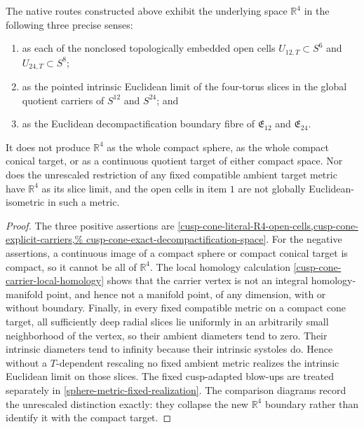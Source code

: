 \begin{corollary}
\label{cusp-cone-sharp-global-R4-scope}
The native routes constructed above exhibit the underlying space
\(\mathbb R^4\) in the following three precise senses:
\begin{enumerate}
\item as each of the nonclosed topologically embedded open cells
\(U_{12,T}\subset S^6\) and \(U_{24,T}\subset S^8\);
\item as the pointed intrinsic Euclidean limit of the four-torus slices in the
global quotient carriers of \(S^{12}\) and \(S^{24}\); and
\item as the Euclidean decompactification boundary fibre of
\(\mathfrak E_{12}\) and \(\mathfrak E_{24}\).
\end{enumerate}
It does not produce \(\mathbb R^4\) as the whole compact sphere, as the
whole compact conical target, or as a continuous quotient target of either
compact space.  Nor does the unrescaled restriction of any fixed compatible
ambient target metric have \(\mathbb R^4\) as its slice limit, and the open
cells in item \(1\) are not globally Euclidean-isometric in such a metric.
\end{corollary}

\begin{proof}
The three positive assertions are
\cref{cusp-cone-literal-R4-open-cells,cusp-cone-explicit-carriers,%
cusp-cone-exact-decompactification-space}.
For the negative assertions, a continuous image of a compact sphere or
compact conical target is compact, so it cannot be all of \(\mathbb R^4\).
The local homology calculation
\cref{cusp-cone-carrier-local-homology} shows that the carrier vertex is not
an integral homology-manifold point, and hence not a manifold point, of any
dimension, with or without boundary.  Finally, in every fixed compatible
metric on a compact cone target, all sufficiently deep radial slices lie
uniformly in an arbitrarily small neighborhood of the vertex, so their ambient
diameters tend to zero.  Their intrinsic diameters tend to infinity because
their intrinsic systoles do.  Hence without a \(T\)-dependent rescaling no
fixed ambient metric realizes the intrinsic Euclidean limit on those slices.
The fixed cusp-adapted blow-ups are treated separately in
\cref{sphere-metric-fixed-realization}.  The comparison diagrams record the
unrescaled distinction exactly: they collapse the new \(\mathbb R^4\)
boundary rather than identify it with the compact target.
\end{proof}

